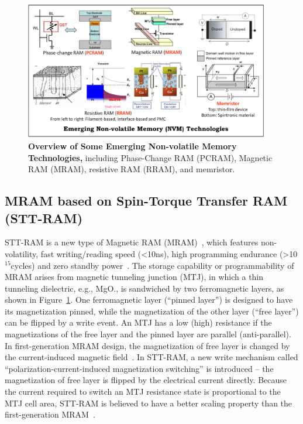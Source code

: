 \begin{figure}
\centering
\includegraphics[width=0.95\textwidth]{./figure/1_technology_half.pdf}
\vspace{-10pt}
\caption{\textbf{Overview of Some Emerging Non-volatile Memory Technologies,} including Phase-Change RAM (PCRAM), Magnetic RAM (MRAM), resistive RAM (RRAM), and memristor. }
\label{technology}
\vspace{-10pt}
\end{figure}

\subsection{MRAM based on Spin-Torque Transfer RAM (STT-RAM)}
STT-RAM is a new type of Magnetic RAM (MRAM)~\cite{ITRS07,Hosomi05,MRAM:TTO+06,MRAM:ZBM+06,mram:ibm:maffitt}, which features non-volatility, fast writing/reading speed (\textless 10ns), high programming endurance (\textgreater 10$^{15}$cycles) and zero standby power~\cite{ITRS07}. The storage capability or programmability of MRAM arises from magnetic tunneling junction (MTJ), in which a thin tunneling dielectric, e.g., MgO., is sandwiched by two ferromagnetic layers, as shown in Figure~\ref{technology}. One ferromagnetic layer (``pinned layer'') is designed to have its magnetization pinned, while the magnetization of the other layer (``free layer'') can be flipped by a write event. An MTJ has a low (high) resistance if the magnetizations of the free layer and the pinned layer are parallel (anti-parallel). In first-generation MRAM design, the magnetization of free layer is changed by the current-induced magnetic field~\cite{Motoyoshi04,Ha04}. In STT-RAM, a new write mechanism called ``polarization-current-induced magnetization switching'' is introduced -- the magnetization of free layer is flipped by the electrical current directly. Because the current required to switch an MTJ resistance state is proportional to the MTJ cell area, STT-RAM is believed to have a better scaling property than the first-generation MRAM~\cite{Hosomi05,Kawahara07,MRAM:TTO+06,Diao07,Salahuddin07,Beach08,Kishi08}.

